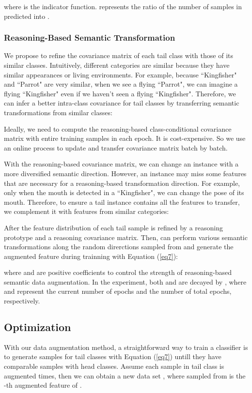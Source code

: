 \documentclass[letterpaper]{article} \usepackage{aaai22}  \usepackage{times}  \usepackage{helvet}  \usepackage{courier}  \usepackage[hyphens]{url}  \usepackage{graphicx} \usepackage{bm}
\begin{document}
	
	where  is the indicator function.  represents the ratio of the number of samples in  predicted into .
	
	\subsubsection{Reasoning-Based Semantic Transformation}
	We propose to refine the covariance matrix of each tail class with those of its similar classes. Intuitively, different categories are similar because they have similar appearances or living environments. 
For example, because ``Kingfisher" and ``Parrot" are very similar, when we see a flying ``Parrot", we can imagine a flying ``Kingfisher" even if we haven't seen a flying ``Kingfisher".
	Therefore, we can infer a better intra-class covariance for tail classes by transferring semantic transformations from similar classes:  
	
	Ideally, we need to compute the reasoning-based class-conditional covariance matrix with entire training samples in each epoch. It is cost-expensive. So we use an online process to update and transfer covariance matrix batch by batch.
	
	With the reasoning-based covariance matrix, we can change an instance with a more diversified semantic direction. However, an instance may miss some features that are necessary for a reasoning-based transformation direction. For example, only when the mouth is detected in a ``Kingfisher", we can change the pose of its mouth. Therefore, to ensure a tail instance contains all the features to transfer, we complement it with features from similar categories: 
	 
	
	After the feature distribution of each tail sample is refined by a reasoning prototype and a reasoning covariance matrix.
Then,  can perform various semantic transformations along the random direrctions sampled from  and generate the augmented feature  during trainning with Equation (\ref{eq7}): 
	
	where  and  are positive coefficients to control the strength of reasoning-based semantic data augmentation. In the experiment, both  and  are decayed by , where  and  represent the current number of epochs and the number of total epochs, respectively.
\subsection{Optimization}
	With our data augmentation method, a straightforward way to train a classifier is to generate samples for tail classes with Equation (\ref{eq7}) untill they have comparable samples with head classes. Assume each sample in tail class  is augmented  times, then we can obtain a new data set , where  sampled from  is the -th augmented feature of .
	
\end{document}
